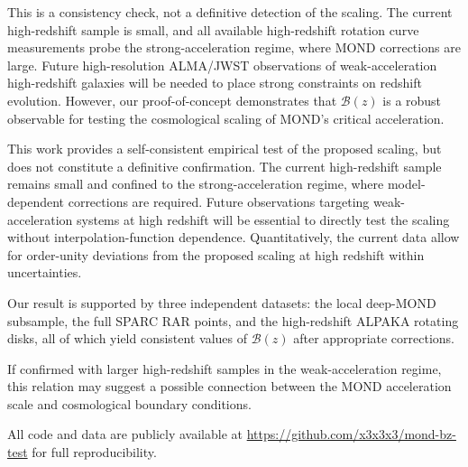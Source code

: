 \documentclass[fleqn,usenatbib]{mnras}
\newcommand{\Bz}{\mathcal{B}(z)}
\begin{document}
This is a consistency check, not a definitive detection of the scaling. The current high-redshift sample is small, and all available high-redshift rotation curve measurements probe the strong-acceleration regime, where MOND corrections are large. Future high-resolution ALMA/JWST observations of weak-acceleration high-redshift galaxies will be needed to place strong constraints on redshift evolution. However, our proof-of-concept demonstrates that $\Bz$ is a robust observable for testing the cosmological scaling of MOND's critical acceleration.

This work provides a self-consistent empirical test of the proposed scaling, but does not constitute a definitive confirmation. The current high-redshift sample remains small and confined to the strong-acceleration regime, where model-dependent corrections are required. Future observations targeting weak-acceleration systems at high redshift will be essential to directly test the scaling without interpolation-function dependence. Quantitatively, the current data allow for order-unity deviations from the proposed scaling at high redshift within uncertainties.

Our result is supported by three independent datasets: the local deep-MOND subsample, the full SPARC RAR points, and the high-redshift ALPAKA rotating disks, all of which yield consistent values of $\Bz$ after appropriate corrections.

If confirmed with larger high-redshift samples in the weak-acceleration regime, this relation may suggest a possible connection between the MOND acceleration scale and cosmological boundary conditions.

All code and data are publicly available at \url{https://github.com/x3x3x3/mond-bz-test} for full reproducibility.



\end{document}
